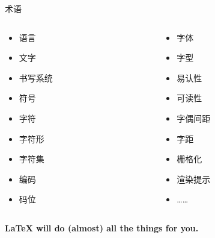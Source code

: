 \begin{frame}{术语}
\footnotesize
\begin{columns}[t]
\begin{column}{0.48\textwidth}
  \begin{itemize}
    \item 语言
    \item 文字
    \item 书写系统
    \item 符号
    \item 字符
    \item 字符形
    \item 字符集
    \item 编码
    \item 码位
  \end{itemize}
\end{column}
\begin{column}{0.48\textwidth}
  \begin{itemize}
    \item 字体
    \item 字型
    \item 易认性
    \item 可读性
    \item 字偶间距
    \item 字距
    \item 栅格化
    \item 渲染提示
    \item ……
  \end{itemize}
\end{column}
\end{columns}
\end{frame}

\begin{frame}[standout]
  \large \textbf{\LaTeX{} will do (almost) all the things for you.}
\end{frame}

